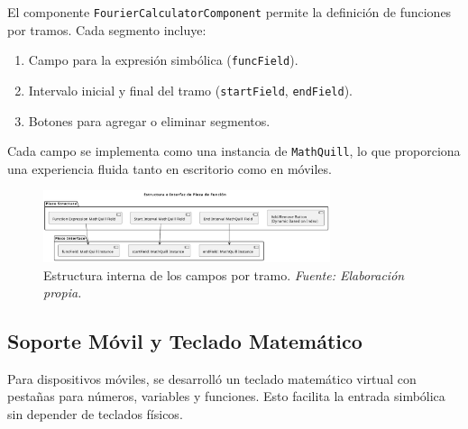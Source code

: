 El componente \texttt{FourierCalculatorComponent} permite la definición de funciones por tramos. Cada segmento incluye:

\begin{enumerate}
	\item Campo para la expresión simbólica (\texttt{funcField}).
	\item Intervalo inicial y final del tramo (\texttt{startField}, \texttt{endField}).
	\item Botones para agregar o eliminar segmentos.
\end{enumerate}

Cada campo se implementa como una instancia de \texttt{MathQuill}, lo que proporciona una experiencia fluida tanto en escritorio como en móviles.

\begin{figure}[H]
	\centering
	\includegraphics[width=0.75\textwidth]{img/chapter07/pieces.pdf}
	\caption[Estructura interna de los campos por tramo.]{Estructura interna de los campos por tramo. \textit{Fuente: Elaboración propia.}}
	\label{fig:frontend-piece-input}
\end{figure}

\subsection{Soporte Móvil y Teclado Matemático}

Para dispositivos móviles, se desarrolló un teclado matemático virtual con pestañas para números, variables y funciones. Esto facilita la entrada simbólica sin depender de teclados físicos.


